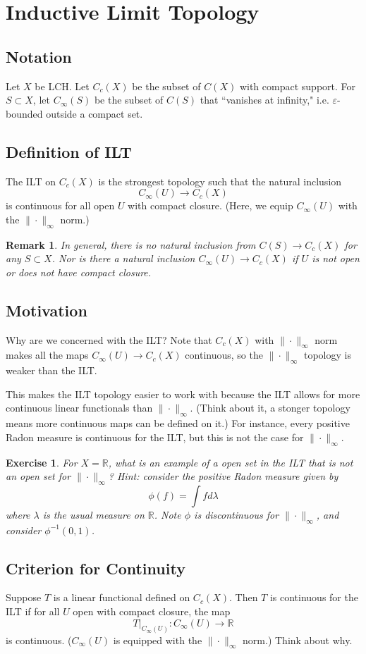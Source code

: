 \documentclass[12pt, letterpaper]{article}
\newtheorem*{remark}{Remark}
\newtheorem{exercise}{Exercise}
\newcommand{\e}{\varepsilon}
\renewcommand{\l}{\lambda}
\newcommand{\bR}{{\mathbb R}}
\renewcommand{\i}{\infty}
\begin{document}
\pagestyle{fancy}

\section*{Inductive Limit Topology}
\subsection*{Notation}
Let $X$ be LCH. Let $C_c(X)$ be the subset of $C(X)$ with compact support. For $S \subset X$, let $C_\i(S)$ be the subset of $C(S)$ that ``vanishes at infinity," i.e. $\e$-bounded outside a compact set.

\subsection*{Definition of ILT}
The ILT on $C_c(X)$ is the strongest topology such that the natural inclusion
\[
    C_\i(U) \rightarrow C_c(X)
\]
is continuous for all open $U$ with compact closure. (Here, we equip $C_\i(U)$ with the $\|\cdot\|_\i$ norm.)

\begin{remark}
    In general, there is no natural inclusion from $C(S) \rightarrow C_c(X)$ for any $S \subset X$. Nor is there a natural inclusion $C_\i(U) \rightarrow C_c(X)$ if $U$ is not open or does not have compact closure.
\end{remark}

\subsection*{Motivation}
Why are we concerned with the ILT? Note that $C_c(X)$ with $\|\cdot\|_\i$ norm makes all the maps $C_\i(U) \rightarrow C_c(X)$ continuous, so the $\|\cdot\|_\i$ topology is weaker than the ILT.

This makes the ILT topology easier to work with because the ILT allows for more continuous linear functionals than $\|\cdot\|_\i$. (Think about it, a stonger topology means more continuous maps can be defined on it.) For instance, every positive Radon measure is continuous for the ILT, but this is not the case for $\|\cdot\|_\i$. 

\begin{exercise}
    For $X = \bR$, what is an example of a open set in the ILT that is not an open set for $\|\cdot\|_\i$? Hint: consider the positive Radon measure given by
    \[
        \phi(f) = \int f d \lambda
    \]
    where $\l$ is the usual measure on $\bR$. Note $\phi$ is discontinuous for $\|\cdot\|_\i$, and consider $\phi^{-1}(0,1)$.
\end{exercise}

\subsection*{Criterion for Continuity}
Suppose $T$ is a linear functional defined on $C_c(X)$. Then $T$ is continuous for the ILT if for all $U$ open with compact closure, the map
\[
    T|_{C_\i(U)}: C_\i(U) \rightarrow \bR
\]
is continuous. ($C_\i(U)$ is equipped with the $\| \cdot\|_\i$ norm.) Think about why.
\end{document}
